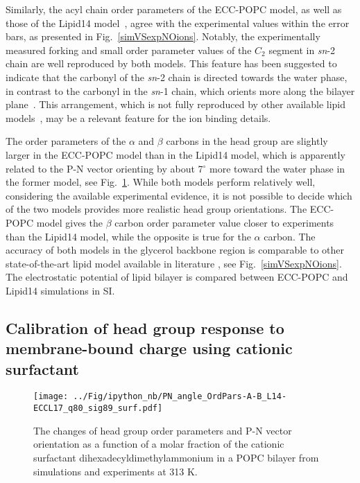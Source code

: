 \documentclass[journal=jpcbfk,manuscript=article]{achemso}
\begin{document}
Similarly, the acyl chain order parameters of the ECC-POPC model, as well as those of the Lipid14 model~\cite{dickson14}, agree with the experimental values within the error bars, as presented in Fig.~\ref{simVSexpNOions}. Notably, the experimentally measured forking and small order parameter values of the $C_2$ segment in {\it sn}-2 chain are well reproduced by both models. This feature has been suggested to indicate that the carbonyl of the {\it sn}-2 chain is directed towards the water phase, in contrast to the carbonyl in the {\it sn}-1 chain, which orients more along the bilayer plane~\cite{seelig75,schindler75,gawrisch92}.
This arrangement, which is not fully reproduced by other available lipid models~\cite{ollila16}, may be a relevant feature for the ion binding details.

The order parameters of the $\alpha$ and $\beta$ carbons in the head group are slightly larger in the ECC-POPC model than in the Lipid14 model, which is apparently related to the P-N vector orienting by about 7$^{\circ}$ more toward the water phase in the former model, see Fig.~\ref{OrderParameterCHANGESsurf}. While both models perform relatively well, considering the available experimental evidence, it is not possible to decide which of the two models provides more realistic head group orientations. The ECC-POPC model gives the $\beta$ carbon order parameter value closer to experiments than the Lipid14 model, while the opposite is true for the $\alpha$ carbon. The accuracy of both models in the glycerol backbone region is comparable to other state-of-the-art lipid model available in literature \cite{botan15}, see Fig.~\ref{simVSexpNOions}.
The electrostatic potential of lipid bilayer is compared between ECC-POPC and Lipid14 simulations in SI.

\subsection{Calibration of head group response to membrane-bound charge using cationic surfactant}\label{section:boundCHARGE}

\begin{figure}[tb!]
  \centering
  \texttt{[image: ../Fig/ipython\_nb/PN\_angle\_OrdPars-A-B\_L14-ECCL17\_q80\_sig89\_surf.pdf]}
  \caption{\label{OrderParameterCHANGESsurf}
    The changes of head group order parameters and P-N vector orientation as a function of
    a molar fraction of the cationic surfactant dihexadecyldimethylammonium in a POPC bilayer
    from simulations and experiments \cite{scherer89} at 313 K.
  }
\end{figure}
\end{document}
